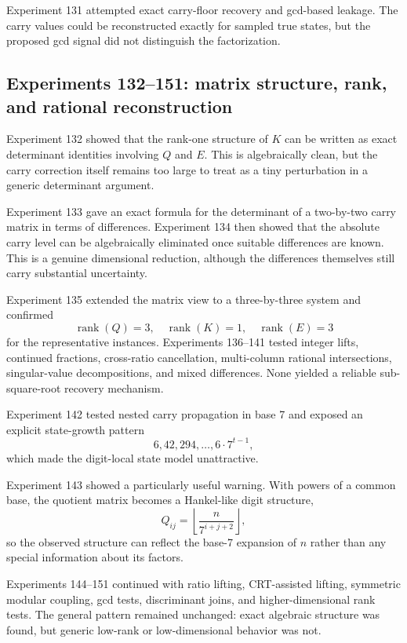 \documentclass[11pt,a4paper]{article}
\begin{document}
Experiment 131 attempted exact carry-floor recovery and gcd-based leakage. The carry values could be reconstructed exactly for sampled true states, but the proposed gcd signal did not distinguish the factorization.

\subsection{Experiments 132--151: matrix structure, rank, and rational reconstruction}
Experiment 132 showed that the rank-one structure of \(K\) can be written as exact determinant identities involving \(Q\) and \(E\). This is algebraically clean, but the carry correction itself remains too large to treat as a tiny perturbation in a generic determinant argument.

Experiment 133 gave an exact formula for the determinant of a two-by-two carry matrix in terms of differences. Experiment 134 then showed that the absolute carry level can be algebraically eliminated once suitable differences are known. This is a genuine dimensional reduction, although the differences themselves still carry substantial uncertainty.

Experiment 135 extended the matrix view to a three-by-three system and confirmed
\[
\operatorname{rank}(Q)=3,
\quad
\operatorname{rank}(K)=1,
\quad
\operatorname{rank}(E)=3
\]
for the representative instances. Experiments 136--141 tested integer lifts, continued fractions, cross-ratio cancellation, multi-column rational intersections, singular-value decompositions, and mixed differences. None yielded a reliable sub-square-root recovery mechanism.

Experiment 142 tested nested carry propagation in base 7 and exposed an explicit state-growth pattern
\[
6,42,294,\dots,6\cdot7^{t-1},
\]
which made the digit-local state model unattractive.

Experiment 143 showed a particularly useful warning. With powers of a common base, the quotient matrix becomes a Hankel-like digit structure,
\[
Q_{ij}=\left\lfloor\frac{n}{7^{i+j+2}}\right\rfloor,
\]
so the observed structure can reflect the base-7 expansion of \(n\) rather than any special information about its factors.

Experiments 144--151 continued with ratio lifting, CRT-assisted lifting, symmetric modular coupling, gcd tests, discriminant joins, and higher-dimensional rank tests. The general pattern remained unchanged: exact algebraic structure was found, but generic low-rank or low-dimensional behavior was not.
\end{document}
